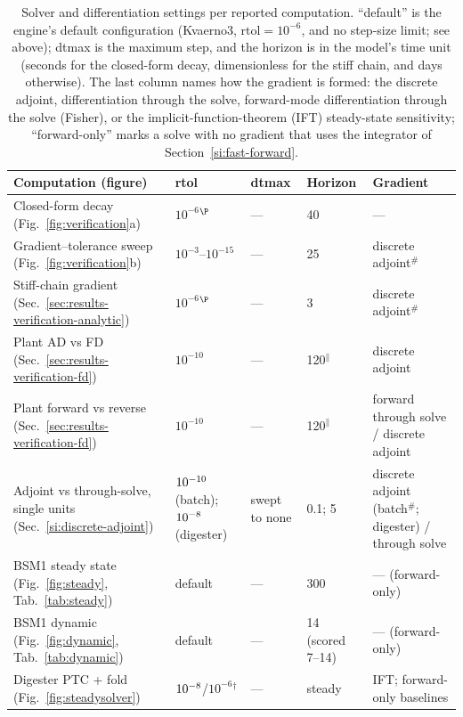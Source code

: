 \documentclass{article}
\begin{document}
\begin{table}[H]
\centering
\caption{Solver and differentiation settings per reported computation.
``default'' is the engine's default configuration (Kvaerno3, \(\mathrm{rtol}=10^{-6}\), and
no step-size limit; see above); dtmax is the maximum step, and the
horizon is in the model's time unit (seconds for the closed-form decay, dimensionless
for the stiff chain, and days otherwise).
The last column names how the gradient is formed: the discrete adjoint,
differentiation through the solve, forward-mode differentiation through the solve
(Fisher), or the implicit-function-theorem (IFT) steady-state sensitivity;
``forward-only'' marks a solve with no gradient that uses the integrator of
Section~\ref{si:fast-forward}.}
\label{tab:settings}
\small
\begin{tabularx}{\linewidth}{>{\raggedright\arraybackslash}X l l l >{\raggedright\arraybackslash}X}
\toprule
Computation (figure) & rtol & dtmax & Horizon & Gradient \\
\midrule
Closed-form decay (Fig.~\ref{fig:verification}a)        & \(10^{-6}\)$^{\P}$ & --- & 40 & --- \\
Gradient--tolerance sweep (Fig.~\ref{fig:verification}b) & \(10^{-3}\)--\(10^{-15}\) & --- & 25 & discrete adjoint$^{\#}$ \\
Stiff-chain gradient (Sec.~\ref{sec:results-verification-analytic}) & \(10^{-6}\)$^{\P}$ & --- & 3 & discrete adjoint$^{\#}$ \\
Plant AD vs FD (Sec.~\ref{sec:results-verification-fd})           & \(10^{-10}\) & --- & 120$^{\|}$ & discrete adjoint \\
Plant forward vs reverse (Sec.~\ref{sec:results-verification-fd}) & \(10^{-10}\) & --- & 120$^{\|}$ & forward through solve / discrete adjoint \\
Adjoint vs through-solve, single units (Sec.~\ref{si:discrete-adjoint}) & \(10^{-10}\) (batch); \(10^{-8}\) (digester) & swept to none & 0.1; 5 & discrete adjoint (batch$^{\#}$; digester) / through solve \\
BSM1 steady state (Fig.~\ref{fig:steady}, Tab.~\ref{tab:steady}) & default & --- & 300 & --- (forward-only) \\
BSM1 dynamic (Fig.~\ref{fig:dynamic}, Tab.~\ref{tab:dynamic}) & default & --- & 14 (scored 7--14) & --- (forward-only) \\
Digester PTC + fold (Fig.~\ref{fig:steadysolver})      & \(10^{-8}\)/\(10^{-6}\)$^{\dagger}$ & --- & steady & IFT; forward-only baselines \\

\end{tabularx}
\end{table}
\end{document}
